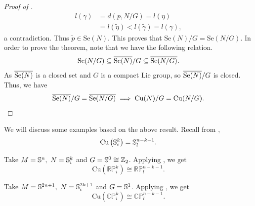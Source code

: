 \begin{proof}[Proof of ]
	\begin{align*}
		l(\gamma) & =  d \left(p,N/G\right) = l(\eta) \\ 
		& = l \left(\tilde{\eta}\right) < l \left(\tilde{\gamma}\right) = l(\gamma),
	\end{align*}
	a contradiction. 
	Thus $\tilde{p}\in \mathrm{Se}(N)$. This proves that $\mathrm{Se}(N)/G=\mathrm{Se}(N/G)$. In order to prove the theorem, note that we have the following relation. 
	\begin{displaymath}
		\mathrm{Se}(N/G) \subseteq \overline{\sen}/G \subseteq \overline{\mathrm{Se}(N/G)}.
	\end{displaymath}
	As $\overline{\sen}$ is a closed set and $G$ is a compact Lie group, so $\overline{\sen}/G$ is closed. Thus, we have 
	\begin{displaymath}
		\overline{\sen}/G = \overline{\mathrm{Se}(N/G)} \implies \cutn/G=\cutn[N/G].
	\end{displaymath}
\end{proof}

\hf We will discuss some examples based on the above result. Recall from , 
\begin{displaymath}
	 \mathrm{Cu} \left(\sbb^k_i\right)=\sbb^{n-k-1}_l.
\end{displaymath}
\begin{eg}
	Take $M=\sbb^{n},~N=\sbb^{k}_i$ and $G=\sbb^0\cong \mathbb{Z}_2$. Applying , we get
	\begin{displaymath}
		\mathrm{Cu}\left(\mathbb{RP}^k_i\right) \cong \mathbb{RP}^{n-k-1}_l.
	\end{displaymath}
\end{eg}

\begin{eg}
	Take $M=\sbb^{2n+1},~N=\sbb^{2k+1}_i$ and $G=\sbb^1$. Applying , we get
	\begin{displaymath}
		\mathrm{Cu}\left(\mathbb{CP}^k_i\right) \cong \mathbb{CP}^{n-k-1}_l.
	\end{displaymath}
\end{eg}

